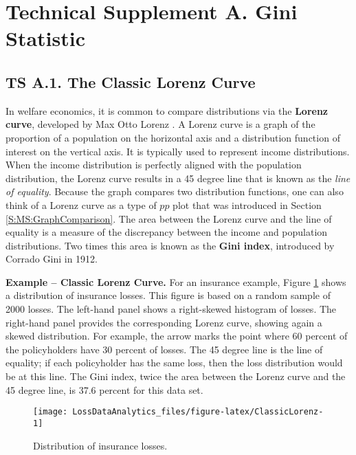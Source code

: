 \documentclass[]{book}
\theoremstyle{definition}
\theoremstyle{definition}
\theoremstyle{definition}
\theoremstyle{remark}
\begin{document}
\section*{Technical Supplement A. Gini
Statistic}\label{technical-supplement-a.-gini-statistic}

\subsection*{TS A.1. The Classic Lorenz
Curve}\label{ts-a.1.-the-classic-lorenz-curve}

In welfare economics, it is common to compare distributions via the
\textbf{Lorenz curve}, developed by Max Otto Lorenz
\citep{lorenz1905methods}. A Lorenz curve is a graph of the proportion
of a population on the horizontal axis and a distribution function of
interest on the vertical axis. It is typically used to represent income
distributions. When the income distribution is perfectly aligned with
the population distribution, the Lorenz curve results in a 45 degree
line that is known as the \emph{line of equality}. Because the graph
compares two distribution functions, one can also think of a Lorenz
curve as a type of \(pp\) plot that was introduced in Section
\ref{S:MS:GraphComparison}. The area between the Lorenz curve and the
line of equality is a measure of the discrepancy between the income and
population distributions. Two times this area is known as the
\textbf{Gini index}, introduced by Corrado Gini in 1912.

\textbf{Example -- Classic Lorenz Curve.} For an insurance example,
Figure \ref{fig:ClassicLorenz} shows a distribution of insurance losses.
This figure is based on a random sample of 2000 losses. The left-hand
panel shows a right-skewed histogram of losses. The right-hand panel
provides the corresponding Lorenz curve, showing again a skewed
distribution. For example, the arrow marks the point where 60 percent of
the policyholders have 30 percent of losses. The 45 degree line is the
line of equality; if each policyholder has the same loss, then the loss
distribution would be at this line. The Gini index, twice the area
between the Lorenz curve and the 45 degree line, is 37.6 percent for
this data set.

\begin{figure}

{\centering \texttt{[image: LossDataAnalytics\_files/figure-latex/ClassicLorenz-1]} 

}

\caption{Distribution of insurance losses.}\label{fig:ClassicLorenz}
\end{figure}
\end{document}
